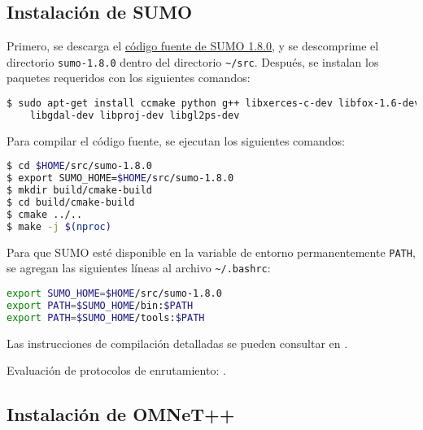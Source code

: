 
\subsection{Instalación de SUMO}

\label{subsec:instalacion_sumo}

Primero, se descarga el
\href{https://sourceforge.net/projects/sumo/files/sumo/}{código fuente de SUMO
1.8.0}, y se descomprime el directorio {\lstinline[language=bash]!sumo-1.8.0!}
dentro del directorio {\lstinline[language=bash]!~/src!}. Después, se instalan
los paquetes requeridos con los siguientes comandos:

\begin{lstlisting}[language=bash]
$ sudo apt-get install ccmake python g++ libxerces-c-dev libfox-1.6-dev \
    libgdal-dev libproj-dev libgl2ps-dev
\end{lstlisting}

Para compilar el código fuente, se ejecutan los siguientes comandos:

\begin{lstlisting}[language=bash]
$ cd $HOME/src/sumo-1.8.0
$ export SUMO_HOME=$HOME/src/sumo-1.8.0
$ mkdir build/cmake-build
$ cd build/cmake-build
$ cmake ../..
$ make -j $(nproc)
\end{lstlisting}

Para que SUMO esté disponible en la variable de entorno permanentemente
{\lstinline[language=bash]!PATH!}, se agregan las siguientes líneas al archivo
{\lstinline[language=bash]!~/.bashrc!}:

\begin{lstlisting}[language=bash]
export SUMO_HOME=$HOME/src/sumo-1.8.0
export PATH=$SUMO_HOME/bin:$PATH
export PATH=$SUMO_HOME/tools:$PATH
\end{lstlisting}

Las instrucciones de compilación detalladas se pueden consultar en
\cite{CompilacionSUMO}.

Evaluación de protocolos de enrutamiento: \cite{Nishat2011}.

\subsection{Instalación de OMNeT++}

